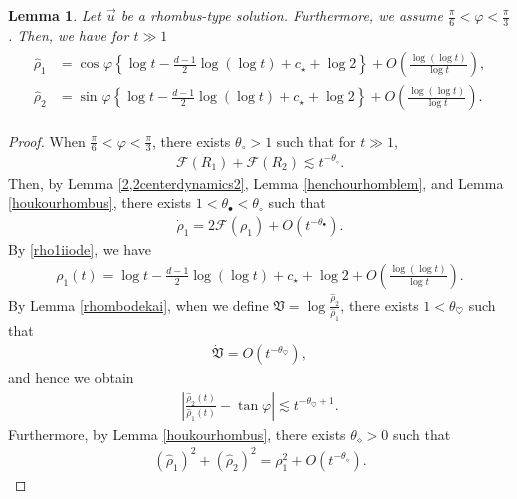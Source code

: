 \documentclass[reqno]{amsart}
\theoremstyle{plain}
\newtheorem{lemma}[theorem]{Lemma}
\theoremstyle{definition}
\numberwithin{equation}{section}
\begin{document}
\begin{lemma}\label{hitantennagasaharplem}
Let $\vec{u}$ be a rhombus-type solution. Furthermore, we assume $\frac{\pi}{6}<\varphi<\frac{\pi}{3}$. Then, we have for $t\gg 1$
\begin{align}\label{hitantensharp}
\begin{aligned}
\hat{\rho}_1&=\cos{\varphi}\left\{\log{t}-\frac{d-1}{2}\log{(\log{t})}+c_{\star}+\log{2} \right\}+O\left(\frac{\log{(\log{t})}}{\log{t}}\right),
\\
\hat{\rho}_2&=\sin{\varphi}\left\{\log{t}-\frac{d-1}{2}\log{(\log{t})}+c_{\star}+\log{2} \right\}+O\left(\frac{\log{(\log{t})}}{\log{t}}\right).
\end{aligned}
\end{align}
\end{lemma}
\begin{proof}
When $\frac{\pi}{6}<\varphi<\frac{\pi}{3}$, there exists $\theta_{\circ}>1$ such that for $t\gg 1$,
\begin{align*}
\mathcal{F}(R_1)+\mathcal{F}(R_2)\lesssim t^{-\theta_{\circ}}.
\end{align*}
Then, by Lemma \ref{2,2centerdynamics2}, Lemma \ref{henchourhomblem}, and Lemma \ref{houkourhombus}, there exists $1<\theta_{\bullet}<\theta_{\circ}$ such that 
\begin{align}\label{rho1iiode}
\dot{\rho}_1=2\mathcal{F}(\rho_1)+O\left(t^{-\theta_{\bullet}}\right).
\end{align}
By \eqref{rho1iiode}, we have
\begin{align}\label{rho1nagasasharp}
\rho_1(t)=\log{t}-\frac{d-1}{2}\log{(\log{t})}+c_{\star}+\log{2}+O\left(\frac{\log{(\log{t})}}{\log{t}}\right).
\end{align}
By Lemma \ref{rhombodekai}, when we define $\mathfrak{V}=\log{\frac{\hat{\rho}_2}{\hat{\rho}_1}}$, there exists $1<\theta_{\heartsuit}$ such that 
\begin{align*}
\dot{\mathfrak{V}}=O\left(t^{-\theta_{\heartsuit}}\right),
\end{align*}
and hence we obtain
\begin{align}\label{kakudosharpconv}
\left|\frac{\hat{\rho}_2(t)}{\hat{\rho}_1(t)}-\tan{\varphi}\right|\lesssim t^{-\theta_{\heartsuit}+1}.
\end{align}
Furthermore, by Lemma \ref{houkourhombus}, there exists $\theta_{\diamond}>0$ such that 
\begin{align}\label{rhokeies1}
\left(\hat{\rho}_1\right)^2+\left(\hat{\rho}_2\right)^2=\rho_1^2+O\left(t^{-\theta_{\diamond}}\right).

\end{align}
\end{proof}
\end{document}
